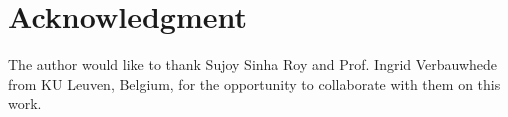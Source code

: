 \documentclass[conference]{IEEEtran_IBSS}
\begin{document}



\section*{Acknowledgment}


The author would like to thank Sujoy Sinha Roy and Prof. Ingrid Verbauwhede from KU Leuven, Belgium, for the opportunity to collaborate with them on this work.



\end{document}
